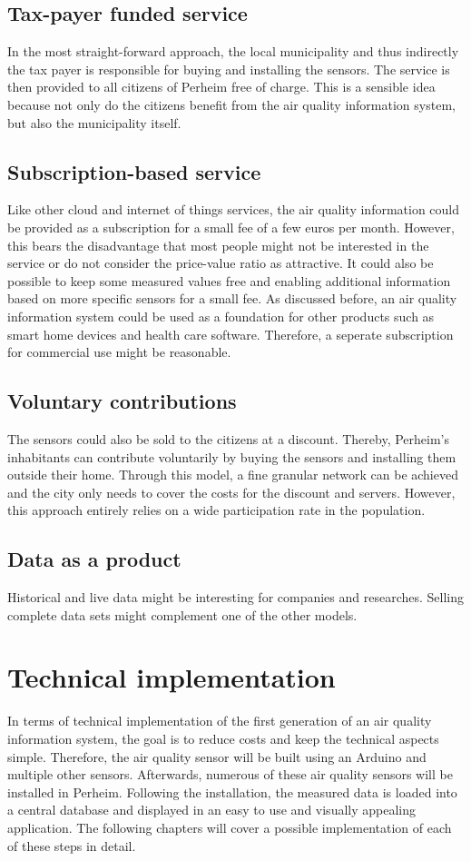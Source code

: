 \documentclass[conference]{IEEEtran}
\begin{document}
\subsection{Tax-payer funded service}
In the most straight-forward approach, the local municipality and thus indirectly the tax payer is responsible for buying and installing the sensors. The service is then provided to all citizens of Perheim free of charge. This is a sensible idea because not only do the citizens benefit from the air quality information system, but also the municipality itself.

\subsection{Subscription-based service}
Like other cloud and internet of things services, the air quality information could be provided as a subscription for a small fee of a few euros per month. However, this bears the disadvantage that most people might not be interested in the service or do not consider the price-value ratio as attractive. It could also be possible to keep some measured values free and enabling additional information based on more specific sensors for a small fee.
As discussed before, an air quality information system could be used as a foundation for other products such as smart home devices and health care software. Therefore, a seperate subscription for commercial use might be reasonable.

\subsection{Voluntary contributions}
The sensors could also be sold to the citizens at a discount. Thereby, Perheim's inhabitants can contribute voluntarily by buying the sensors and installing them outside their home. Through this model, a fine granular network can be achieved and the city only needs to cover the costs for the discount and servers. However, this approach entirely relies on a wide participation rate in the population.

\subsection{Data as a product}
Historical and live data might be interesting for companies and researches. Selling complete data sets might complement one of the other models. 


\section{Technical implementation} \label{sec:TechnicalImplementation}
In terms of technical implementation of the first generation of an air quality information system, the goal is to reduce costs and keep the technical aspects simple. Therefore, the air quality sensor will be built using an Arduino and multiple other sensors. Afterwards, numerous of these air quality sensors will be installed in Perheim. Following the installation, the measured data is loaded into a central database and displayed in an easy to use and visually appealing application. The following chapters will cover a possible implementation of each of these steps in detail.
\end{document}
